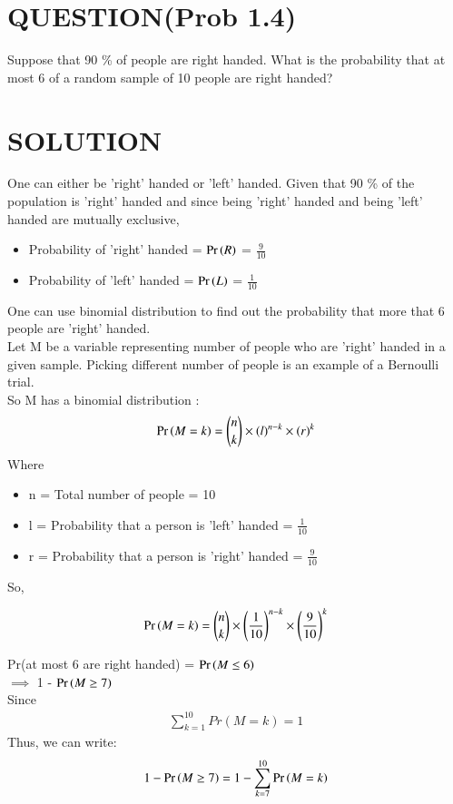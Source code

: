 \documentclass[journal,12pt,twocolumn]{IEEEtran}
\begin{document}
\section*{QUESTION(Prob 1.4)}
Suppose that 90 \% of people are right handed. 
What is the probability that at most 6 of a random sample 
of 10 people are right handed?\\
\section*{SOLUTION}
One can either be 'right' handed or 'left' handed. Given that 90 \% of the population is 'right' handed and since being 'right' handed and being 'left' handed are mutually exclusive,
\bigskip
\begin{itemize}
\item Probability of 'right' handed = $\Pr\left(R\right)$ = \(\frac{9}{10}\)
\item Probability of 'left' handed = $\Pr\left(L\right)$ = \( \frac{1}{10} \)
\end{itemize}
\bigskip
One can use binomial distribution to find out the probability that more that 6 people are 'right' handed.\\
Let M be a variable representing number of people who are 'right' handed in a given sample. Picking different number of people is an example of a Bernoulli trial.\\
So M has a binomial distribution : 
\begin{align}
\Pr\left(M=k\right) = {{n}\choose{k}} \times (l)^{n-k} \times (r)^{k}\label{0.0.1}
\end{align}
Where
\begin{itemize}
    \item n = Total number of people = 10 
    \item l = Probability that a person is 'left' handed = \( \frac{1}{10} \)
    \item r = Probability that a person is 'right' handed = \( \frac{9}{10} \)
\end{itemize}
\bigskip
So,

\begin{align}
\Pr\left(M=k\right) = {{n}\choose{k}} \times \left(\frac{1}{10}\right)^{n-k} \times \left(\frac{9}{10}\right)^{k}
\end{align}

Pr(at most 6 are right handed) = $\Pr\left(M \leq 6\right)$ \\
$\implies$ 1 - $\Pr\left(M \geq 7\right)$\\
Since\\
\bigskip
\begin{align}
\sum_{k=1}^{10} Pr(M=k) = 1\label{0.0.3}
\end{align}
\bigskip
Thus, we can write:
\begin{align}
1 - \Pr\left(M \geq 7\right) = 1 - \sum_{k=7}^{10} \Pr\left(M=k\right)\label{0.0.4}
\end{align}
\end{document}
